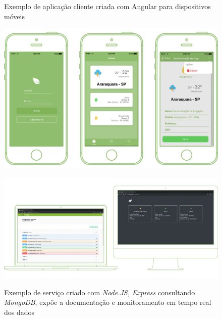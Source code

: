 \documentclass[
	12pt,				%
	openright,			%
	twoside,			%
	a4paper,			%
	english,			%
	brazil				%
	]{abntex2}
\begin{document}
\begin{figure}[h]
	\centering

	\caption{Exemplo de aplicação cliente criada com Angular para dispositivos móveis} \label{fig:ClientAppExample}
    \includegraphics[scale=0.4]{client-app} \\

    \caption{Exemplo de serviço criado com \textit{Node.JS, Express} consultando \textit{MongoDB}, expõe a documentação e monitoramento em tempo real dos dados} \label{fig:ServerAppExample}
    \includegraphics[scale=0.45]{server-app} \\

\end{figure}

\postextual


\end{document}
